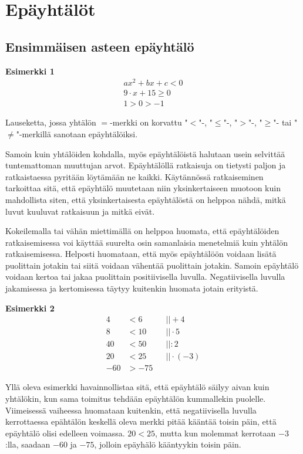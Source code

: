 \chapter{Epäyhtälöt}

\section{Ensimmäisen asteen epäyhtälö}

\textbf{Esimerkki 1}
\begin{align*}
ax^2+bx+c<0 \\
9 \cdot x+15\geq 0 \\
1>0>-1 
\end{align*}

Lauseketta, jossa yhtälön $=$-merkki on korvattu
"$<$"-, "$\leq$"-, "$>$"-, "$\geq$"- tai "$\neq$"-merkillä sanotaan epäyhtälöiksi.

Samoin kuin yhtälöiden kohdalla, myös epäyhtälöistä halutaan usein selvittää
tuntemattoman muuttujan arvot. Epäyhtälöllä ratkaisuja on tietysti paljon ja ratkaistaessa
pyritään löytämään ne kaikki. Käytännössä ratkaiseminen tarkoittaa sitä, että epäyhtälö
muutetaan niin yksinkertaiseen muotoon kuin mahdollista siten, että yksinkertaisesta epäyhtälöstä
on helppoa nähdä, mitkä luvut kuuluvat ratkaisuun ja mitkä eivät.

Kokeilemalla tai vähän miettimällä on helppoa huomata, että epäyhtälöiden ratkaisemisessa
voi käyttää suurelta osin samanlaisia menetelmiä kuin yhtälön ratkaisemisessa. Helposti huomataan,
että myös epäyhtälöön voidaan lisätä puolittain jotakin tai siitä voidaan vähentää puolittain jotakin.
Samoin epäyhtälö voidaan kertoa tai jakaa puolittain positiivisella luvulla. Negatiivisella luvulla
jakamisessa ja kertomisessa täytyy kuitenkin huomata jotain erityistä.

\textbf{Esimerkki 2}
\begin{align*}
4&<6  \ \ \ \ \ &&|| +4 \\
8&<10 &&|| \cdot 5 \\
40&<50 &&|| :2 \\
20&<25 &&|| \cdot (-3) \\
-60&>-75
\end{align*}

Yllä oleva esimerkki havainnollistaa sitä, että epäyhtälö säilyy aivan kuin yhtälökin, kun sama toimitus tehdään
epäyhtälön kummallekin puolelle. Viimeisessä vaiheessa huomataan kuitenkin, että negatiivisella luvulla kerrottaessa
epähtälön keskellä oleva merkki pitää kääntää toisin päin, että epäyhtälö olisi edelleen voimassa. $20<25$, mutta kun molemmat
kerrotaan $-3$:lla, saadaan $-60$ ja $-75$, jolloin epäyhälö kääntyykin toisin päin.

